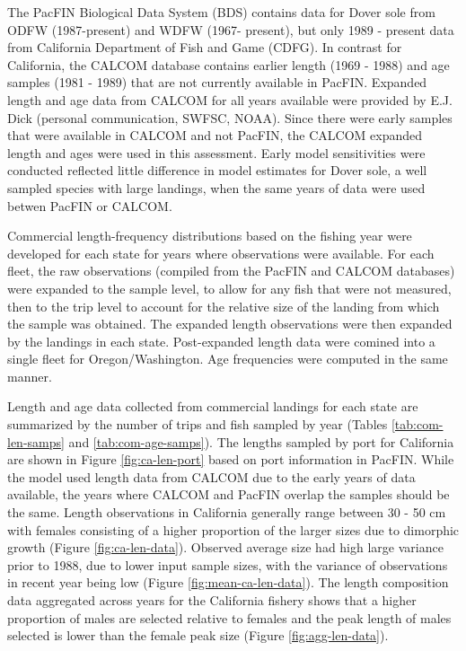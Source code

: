 \documentclass[11pt,
  english,
  a4paper,
]{article}
\begin{document}
\leavevmode\tagmcend\tagstructend


The PacFIN Biological Data System (BDS) contains data for Dover sole from ODFW (1987-present) and WDFW (1967- present), but only 1989 - present data from California Department of Fish and Game (CDFG). In contrast for California, the CALCOM database contains earlier length (1969 - 1988) and age samples (1981 - 1989) that are not currently available in PacFIN. Expanded length and age data from CALCOM for all years available were provided by E.J. Dick (personal communication, SWFSC, NOAA). Since there were early samples that were available in CALCOM and not PacFIN, the CALCOM expanded length and ages were used in this assessment. Early model sensitivities were conducted reflected little difference in model estimates for Dover sole, a well sampled species with large landings, when the same years of data were used betwen PacFIN or CALCOM.

\leavevmode\tagmcend\tagstructend\par


Commercial length-frequency distributions based on the fishing year were developed for each state for years where observations were available. For each fleet, the raw observations (compiled from the PacFIN and CALCOM databases) were expanded to the sample level, to allow for any fish that were not measured, then to the trip level to account for the relative size of the landing from which the sample was obtained. The expanded length observations were then expanded by the landings in each state. Post-expanded length data were comined into a single fleet for Oregon/Washington. Age frequencies were computed in the same manner.

\leavevmode\tagmcend\tagstructend\par


Length and age data collected from commercial landings for each state are summarized by the number of trips and fish sampled by year (Tables \ref{tab:com-len-samps} and \ref{tab:com-age-samps}). The lengths sampled by port for California are shown in Figure \ref{fig:ca-len-port} based on port information in PacFIN. While the model used length data from CALCOM due to the early years of data available, the years where CALCOM and PacFIN overlap the samples should be the same. Length observations in California generally range between 30 - 50 cm with females consisting of a higher proportion of the larger sizes due to dimorphic growth (Figure \ref{fig:ca-len-data}). Observed average size had high large variance prior to 1988, due to lower input sample sizes, with the variance of observations in recent year being low (Figure \ref{fig:mean-ca-len-data}). The length composition data aggregated across years for the California fishery shows that a higher proportion of males are selected relative to females and the peak length of males selected is lower than the female peak size (Figure \ref{fig:agg-len-data}).
\end{document}

